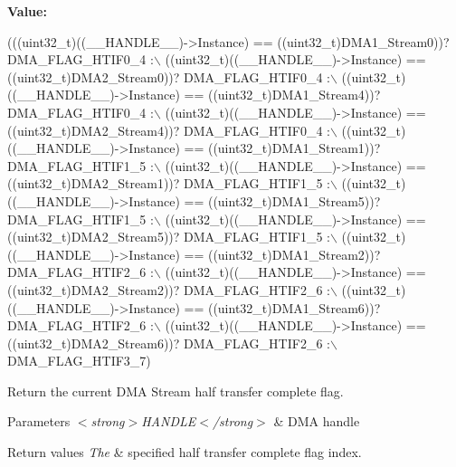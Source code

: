 {\bfseries Value\+:}
\begin{DoxyCode}
(((uint32\_t)((\_\_HANDLE\_\_)->Instance) == ((uint32\_t)DMA1\_Stream0))? DMA\_FLAG\_HTIF0\_4 :\(\backslash\)
 ((uint32\_t)((\_\_HANDLE\_\_)->Instance) == ((uint32\_t)DMA2\_Stream0))? DMA\_FLAG\_HTIF0\_4 :\(\backslash\)
 ((uint32\_t)((\_\_HANDLE\_\_)->Instance) == ((uint32\_t)DMA1\_Stream4))? DMA\_FLAG\_HTIF0\_4 :\(\backslash\)
 ((uint32\_t)((\_\_HANDLE\_\_)->Instance) == ((uint32\_t)DMA2\_Stream4))? DMA\_FLAG\_HTIF0\_4 :\(\backslash\)
 ((uint32\_t)((\_\_HANDLE\_\_)->Instance) == ((uint32\_t)DMA1\_Stream1))? DMA\_FLAG\_HTIF1\_5 :\(\backslash\)
 ((uint32\_t)((\_\_HANDLE\_\_)->Instance) == ((uint32\_t)DMA2\_Stream1))? DMA\_FLAG\_HTIF1\_5 :\(\backslash\)
 ((uint32\_t)((\_\_HANDLE\_\_)->Instance) == ((uint32\_t)DMA1\_Stream5))? DMA\_FLAG\_HTIF1\_5 :\(\backslash\)
 ((uint32\_t)((\_\_HANDLE\_\_)->Instance) == ((uint32\_t)DMA2\_Stream5))? DMA\_FLAG\_HTIF1\_5 :\(\backslash\)
 ((uint32\_t)((\_\_HANDLE\_\_)->Instance) == ((uint32\_t)DMA1\_Stream2))? DMA\_FLAG\_HTIF2\_6 :\(\backslash\)
 ((uint32\_t)((\_\_HANDLE\_\_)->Instance) == ((uint32\_t)DMA2\_Stream2))? DMA\_FLAG\_HTIF2\_6 :\(\backslash\)
 ((uint32\_t)((\_\_HANDLE\_\_)->Instance) == ((uint32\_t)DMA1\_Stream6))? DMA\_FLAG\_HTIF2\_6 :\(\backslash\)
 ((uint32\_t)((\_\_HANDLE\_\_)->Instance) == ((uint32\_t)DMA2\_Stream6))? DMA\_FLAG\_HTIF2\_6 :\(\backslash\)
   DMA\_FLAG\_HTIF3\_7)
\end{DoxyCode}


Return the current D\+MA Stream half transfer complete flag. 


\begin{DoxyParams}{Parameters}
{\em $<$strong$>$\+H\+A\+N\+D\+L\+E$<$/strong$>$} & D\+MA handle \\
\hline
\end{DoxyParams}

\begin{DoxyRetVals}{Return values}
{\em The} & specified half transfer complete flag index. \\
\hline
\end{DoxyRetVals}
\mbox{\label{group___d_m_a_ga206f24e6bee4600515b9b6b1ec79365b}} 
